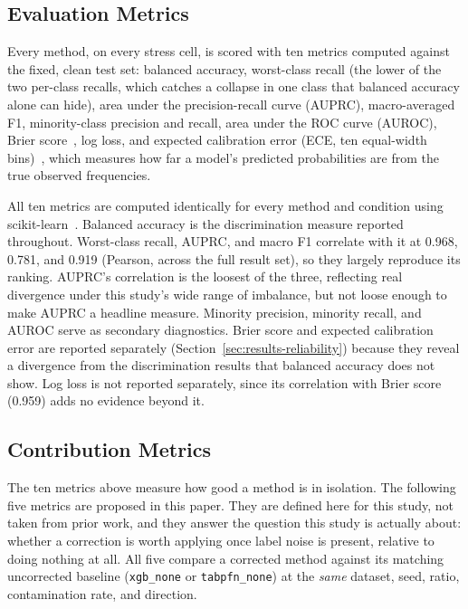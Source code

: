 \subsection{Evaluation Metrics}
\label{sec:methods-metrics}

Every method, on every stress cell, is scored with ten metrics computed
against the fixed, clean test set: balanced accuracy, worst-class recall
(the lower of the two per-class recalls, which catches a collapse in one
class that balanced accuracy alone can hide), area under the
precision-recall curve (AUPRC), macro-averaged F1, minority-class
precision and recall, area under the ROC curve (AUROC), Brier
score~\cite{brier1950verification}, log loss, and expected calibration
error (ECE, ten equal-width bins)~\cite{guo2017calibration}, which
measures how far a model's predicted probabilities are from the true
observed frequencies.

All ten metrics are computed identically for every method and condition using scikit-learn~\cite{pedregosa2011scikitlearn}. Balanced accuracy is the discrimination measure reported throughout. Worst-class recall, AUPRC, and macro F1 correlate with it at 0.968, 0.781, and 0.919 (Pearson, across the full result set), so they largely reproduce its ranking. AUPRC's correlation is the loosest of the three, reflecting real divergence under this study's wide range of imbalance, but not loose enough to make AUPRC a headline measure. Minority precision, minority recall, and AUROC serve as secondary diagnostics. Brier score and expected calibration error are reported separately (Section~\ref{sec:results-reliability}) because they reveal a divergence from the discrimination results that balanced accuracy does not show. Log loss is not reported separately, since its correlation with Brier score (0.959) adds no evidence beyond it.

\subsection{Contribution Metrics}
\label{sec:methods-contribution}

The ten metrics above measure how good a method is in isolation. The
following five metrics are proposed in this paper. They are defined here for
this study, not taken from prior work, and they answer the question this study
is actually about: whether a correction is worth applying once label noise is
present, relative to doing nothing at all. All five compare a corrected method against its
matching uncorrected baseline (\texttt{xgb\_none} or \texttt{tabpfn\_none})
at the \emph{same} dataset, seed, ratio, contamination rate, and direction.

